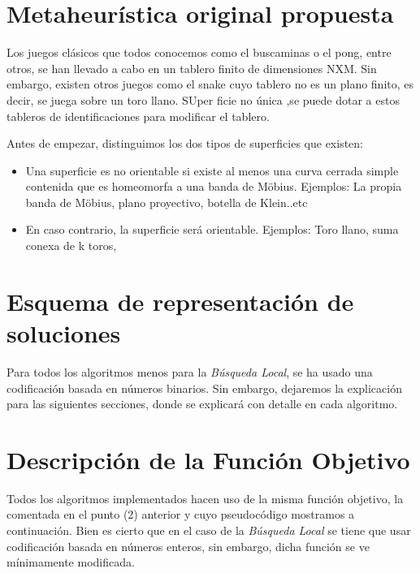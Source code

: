 \section{Metaheurística original propuesta}

Los juegos clásicos que todos conocemos como el buscaminas o el pong, entre otros, se han llevado a cabo en un tablero finito  de dimensiones NXM. 
Sin embargo, existen otros juegos como el snake cuyo tablero no es un plano finito, es decir, se juega sobre un toro llano. SUper ficie no única ,se puede dotar a estos tableros de identificaciones para modificar el tablero.

Antes de empezar, distinguimos los dos tipos de superficies que existen:

\begin{itemize}
	\item  Una superficie es no orientable si existe al menos una curva cerrada simple contenida que es homeomorfa a una banda de Möbius. Ejemplos: La propia banda de Möbius, plano proyectivo, botella de Klein..etc
	\item En caso contrario, la superficie será orientable. Ejemplos: Toro llano, suma conexa de k toros,
\end{itemize}




\newpage 
\section{Esquema de representación de soluciones}

Para todos los algoritmos menos para la \textit{Búsqueda Local}, se ha usado una codificación basada en números binarios. Sin embargo, dejaremos la explicación para las siguientes secciones, donde se explicará con detalle en cada algoritmo.


\section{Descripción de la Función Objetivo}

Todos los algoritmos implementados hacen uso de la misma función objetivo, la comentada en el punto (2) anterior y cuyo pseudocódigo mostramos a continuación. Bien es cierto que en el caso de la \textit{Búsqueda Local} se tiene que usar codificación basada en números enteros, sin embargo, dicha función se ve mínimamente modificada.


